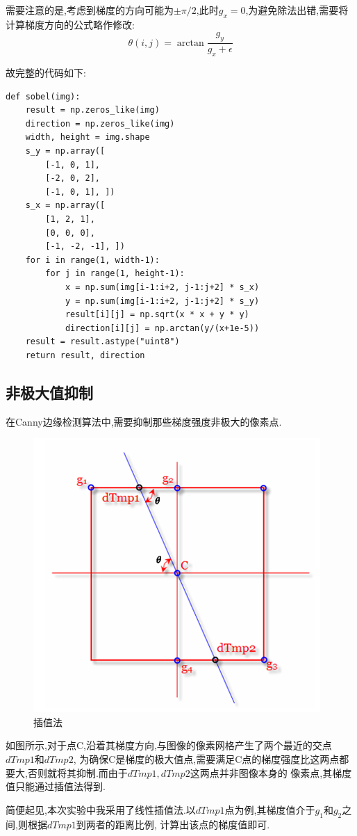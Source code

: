 \documentclass[a4paper]{article}
\begin{document}
需要注意的是,考虑到梯度的方向可能为$\pm \pi/2$,此时$g_x =0$,为避免除法出错,需要将计算梯度方向的公式略作修改:
$$\theta(i,j) = \arctan{\frac{g_y}{g_x + \epsilon}}$$

故完整的代码如下:
\begin{verbatim}
def sobel(img):
    result = np.zeros_like(img)
    direction = np.zeros_like(img)
    width, height = img.shape
    s_y = np.array([
        [-1, 0, 1],
        [-2, 0, 2],
        [-1, 0, 1], ])
    s_x = np.array([
        [1, 2, 1],
        [0, 0, 0],
        [-1, -2, -1], ])
    for i in range(1, width-1):
        for j in range(1, height-1):
            x = np.sum(img[i-1:i+2, j-1:j+2] * s_x)
            y = np.sum(img[i-1:i+2, j-1:j+2] * s_y)
            result[i][j] = np.sqrt(x * x + y * y)
            direction[i][j] = np.arctan(y/(x+1e-5))
    result = result.astype("uint8")
    return result, direction
\end{verbatim}
        \subsection{非极大值抑制}
在Canny边缘检测算法中,需要抑制那些梯度强度非极大的像素点.

\begin{figure}[H]
\centering
\includegraphics[width=.6\textwidth]{img/nms.png}
\caption{插值法}
\end{figure}

如图所示,对于点C,沿着其梯度方向,与图像的像素网格产生了两个最近的交点$dTmp1$和$dTmp2$,
为确保C是梯度的极大值点,需要满足C点的梯度强度比这两点都要大,否则就将其抑制.而由于$dTmp1,dTmp2$这两点并非图像本身的
像素点,其梯度值只能通过插值法得到.

简便起见,本次实验中我采用了线性插值法.以$dTmp1$点为例,其梯度值介于$g_1$和$g_2$之间,则根据$dTmp1$到两者的距离比例,
计算出该点的梯度值即可.
\end{document}
